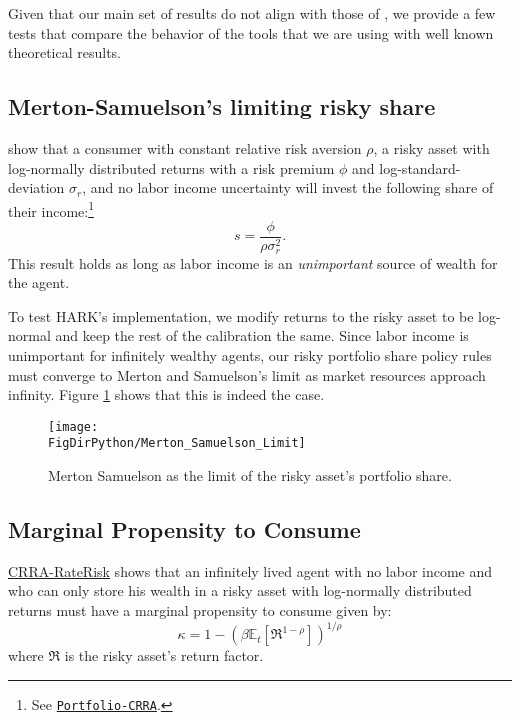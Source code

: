 \documentclass[../CGMPortfolio.tex]{subfiles}
\begin{document}
Given that our main set of results do not align with those of \cite{cgm2015},
we provide a few tests that compare the behavior of the tools that we are using with well known theoretical results.

\subsection{Merton-Samuelson's limiting risky share}

\cite{merton,samuelson} show that a consumer with constant relative
risk aversion $\rho$, a risky asset with log-normally distributed returns
with a risk premium $\phi$ and log-standard-deviation $\sigma_r$, and no labor income uncertainty will invest the following share of their income:\footnote{See 
\href{http://www.econ2.jhu.edu/people/ccarroll/public/lecturenotes/AssetPricing/Portfolio-CRRA/}{\texttt{Portfolio-CRRA}}.}
\begin{equation}
	s = \frac{\phi}{\rho \sigma^2_r}.
\end{equation}
This result holds as long as labor income is an \emph{unimportant} source of
wealth for the agent.

To test HARK's implementation, we modify returns to the risky asset to be 
log-normal and keep the rest of the calibration the same. Since labor income
is unimportant for infinitely wealthy agents, our risky portfolio share policy rules must converge to Merton and Samuelson's limit as market resources approach infinity. Figure \ref{fig:MS_share_limit} shows that this is indeed the case.

\begin{figure}[h]
	\texttt{[image: \\FigDirPython/Merton\_Samuelson\_Limit]}
	\caption{Merton Samuelson as the limit of the risky asset's portfolio 
		share.}\label{fig:MS_share_limit}
\end{figure}

\subsection{Marginal Propensity to Consume}

\href{http://www.econ2.jhu.edu/people/ccarroll/public/LectureNotes/Consumption/CRRA-RateRisk/}{CRRA-RateRisk}
shows that an infinitely lived agent with no labor income and who can only 
store his wealth in a risky asset with log-normally distributed
returns must have a marginal propensity to consume given by:
\begin{equation}\label{eq:mpc_limit}
	\kappa = 1 - \left( \beta \mathbb{E}_t \left[ \mathfrak{R}^{1-\rho} \right] 
	\right)	^{1/\rho}
\end{equation}
where $\mathfrak{R}$ is the risky asset's return factor.
\end{document}

